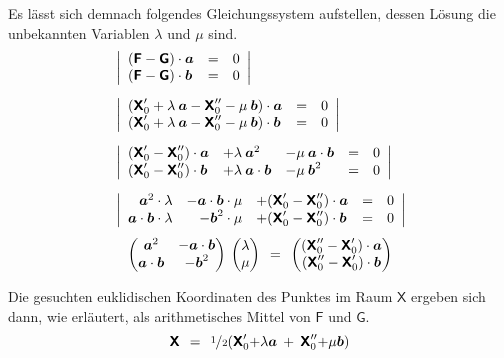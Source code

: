 \noindent Es lässt sich demnach folgendes Gleichungssystem aufstellen, dessen Lösung die unbekannten Variablen $\lambda$ und $\mu$ sind.
\begin{align*}
	&\left|
	\begin{array}{lcl}
		(\boldsymbol{\mathsf{F}}-\boldsymbol{\mathsf{G}})\cdot\boldsymbol{a} & = & 0\\
		(\boldsymbol{\mathsf{F}}-\boldsymbol{\mathsf{G}})\cdot\boldsymbol{b} & = & 0
	\end{array}		
	\right| \\[0.2cm]
%
	&\left|
	\begin{array}{lcl}
		(\XC'_0+\lambda\:\boldsymbol{a} - \XC''_0-\mu\:\boldsymbol{b}) \cdot\boldsymbol{a} & = & 0\\
		(\XC'_0+\lambda\:\boldsymbol{a} - \XC''_0-\mu\:\boldsymbol{b}) \cdot\boldsymbol{b} & = & 0
	\end{array}
	\right| \\[0.2cm]
%
	&\left|
	\begin{array}{lllcl}
		(\XC'_0 -  \XC''_0)\cdot\boldsymbol{a} & + \lambda\:\boldsymbol{a}^2 & - \mu\:\boldsymbol{a}\cdot\boldsymbol{b} & = & 0\\
		(\XC'_0 -  \XC''_0)\cdot\boldsymbol{b} & + \lambda\:\boldsymbol{a}\cdot\boldsymbol{b} & - \mu\:\boldsymbol{b}^2 & = & 0
	\end{array} 
	\right| \\[0.2cm]
%
	&\left|
		\begin{array}{rrlcl}
			\boldsymbol{a}^2\cdot\lambda & -\boldsymbol{a}\cdot\boldsymbol{b}\cdot\mu & +(\XC'_0 -  \XC''_0)\cdot\boldsymbol{a} & = & 0\\
			\boldsymbol{a}\cdot\boldsymbol{b}\cdot\lambda & -\boldsymbol{b}^2\cdot\mu & +(\XC'_0 -  \XC''_0)\cdot\boldsymbol{b} & = & 0
		\end{array} 
		\right|
\end{align*}\vspace{0.15cm}
\begin{equation}
	\begin{pmatrix}
		\boldsymbol{a}^2 & -\boldsymbol{a}\cdot\boldsymbol{b}\\
		\boldsymbol{a}\cdot\boldsymbol{b} & -\boldsymbol{b}^2
	\end{pmatrix}
	\:\begin{pmatrix}\lambda\\\mu\end{pmatrix}
	\:\:=\:\:
	\begin{pmatrix}
		(\boldsymbol{\mathsf{X}}''_0 -  \boldsymbol{\mathsf{X}}'_0)\cdot\boldsymbol{a}\\
		(\boldsymbol{\mathsf{X}}''_0 -  \boldsymbol{\mathsf{X}}'_0)\cdot\boldsymbol{b}
	\end{pmatrix}
\end{equation}\vspace{0.2cm}

{\noindent}Die gesuchten euklidischen Koordinaten des Punktes im Raum $\mathsf{X}$ ergeben sich dann, wie erläutert, als arithmetisches Mittel von $\mathsf{F}$ und $\mathsf{G}$.
\begin{equation}
	\boldsymbol{\mathsf{X}} \:\:=\:\:  \sfrac{1}{\mspace{2mu}2} ( \boldsymbol{\mathsf{X}}'_0{+}\lambda\boldsymbol{a} \:+\: \boldsymbol{\mathsf{X}}''_0{+}\mu\boldsymbol{b} )
\end{equation}
